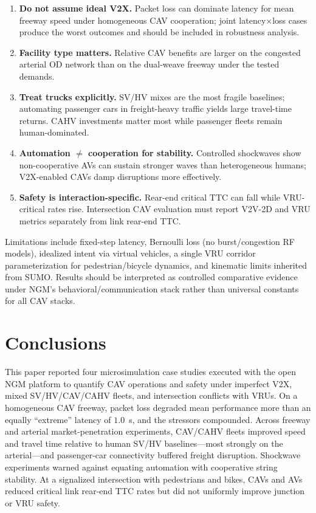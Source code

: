 \documentclass[numbered]{trbunofficial}
\begin{document}
\begin{enumerate}
  \item \textbf{Do not assume ideal V2X.} Packet loss can dominate latency for mean freeway
        speed under homogeneous CAV cooperation; joint latency$\times$loss cases produce the
        worst outcomes and should be included in robustness analysis.
  \item \textbf{Facility type matters.} Relative CAV benefits are larger on the congested
        arterial OD network than on the dual-weave freeway under the tested demands.
  \item \textbf{Treat trucks explicitly.} SV/HV mixes are the most fragile baselines;
        automating passenger cars in freight-heavy traffic yields large travel-time returns.
        CAHV investments matter most while passenger fleets remain human-dominated.
  \item \textbf{Automation $\neq$ cooperation for stability.} Controlled shockwaves show
        non-cooperative AVs can sustain stronger waves than heterogeneous humans; V2X-enabled
        CAVs damp disruptions more effectively.
  \item \textbf{Safety is interaction-specific.} Rear-end critical TTC can fall while
        VRU-critical rates rise. Intersection CAV evaluation must report V2V-2D and VRU
        metrics separately from link rear-end TTC.
\end{enumerate}

Limitations include fixed-step latency, Bernoulli loss (no burst/congestion RF models),
idealized intent via virtual vehicles, a single VRU corridor parameterization for
pedestrian/bicycle dynamics, and kinematic limits inherited from SUMO. Results should be
interpreted as controlled comparative evidence under NGM's behavioral/communication stack
rather than universal constants for all CAV stacks.

\section{Conclusions}
\label{sec:conclusion}
This paper reported four microsimulation case studies executed with the open NGM platform to
quantify CAV operations and safety under imperfect V2X, mixed SV/HV/CAV/CAHV fleets, and
intersection conflicts with VRUs. On a homogeneous CAV freeway, packet loss degraded mean
performance more than an equally ``extreme'' latency of $1.0$~s, and the stressors compounded.
Across freeway and arterial market-penetration experiments, CAV/CAHV fleets improved speed and
travel time relative to human SV/HV baselines---most strongly on the arterial---and
passenger-car connectivity buffered freight disruption. Shockwave experiments warned against
equating automation with cooperative string stability. At a signalized intersection with
pedestrians and bikes, CAVs and AVs reduced critical link rear-end TTC rates but did not
uniformly improve junction or VRU safety.
\end{document}
